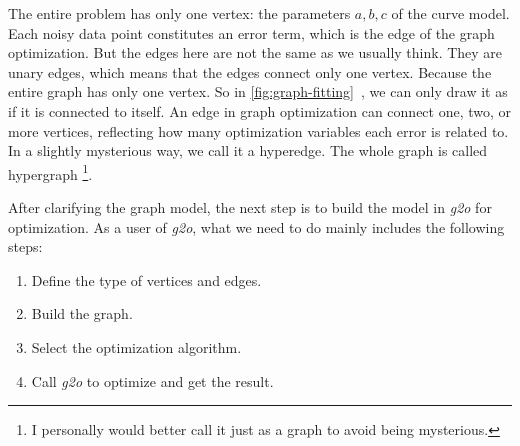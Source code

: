 The entire problem has only one vertex: the parameters $a, b, c$ of the curve model. Each noisy data point constitutes an error term, which is the edge of the graph optimization. But the edges here are not the same as we usually think. They are unary edges, which means that the edges connect only one vertex. Because the entire graph has only one vertex. So in \autoref{fig:graph-fitting}~, we can only draw it as if it is connected to itself. An edge in graph optimization can connect one, two, or more vertices, reflecting how many optimization variables each error is related to. In a slightly mysterious way, we call it a hyperedge. The whole graph is called hypergraph \footnote{I personally would better call it just as a graph to avoid being mysterious. }.

After clarifying the graph model, the next step is to build the model in \textit{g2o} for optimization. As a user of \textit{g2o}, what we need to do mainly includes the following steps:
\begin{enumerate}
    \item Define the type of vertices and edges.
    \item Build the graph.
    \item Select the optimization algorithm.
    \item Call \textit{g2o} to optimize and get the result.
\end{enumerate}

